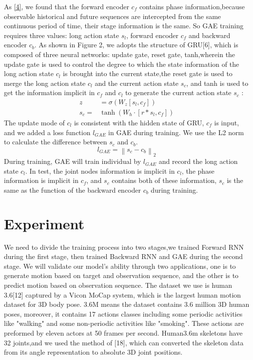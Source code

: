 \documentclass[conference]{IEEEtran}
\begin{document}
As \eqref{4}, we found that the forward encoder $c_f$ contains phase information,because observable historical and future sequences are intercepted from the same continuous period of time, their stage information is the same.
So GAE training requires three values: long action state $s_l$, forward encoder $c_f$ and backward encoder $c_b$.
As shown in Figure 2, we adopts the structure of GRU[6], which is composed of three neural networks: update gate, reset gate,
tanh,wherein the update gate is used to control the degree to which the state information of the long action state $c_l$ is brought into the current state,the reset gate is used to merge the long action state $c_l$ and the current action state $s_c$, and tanh is used to get the information implicit in $c_f$ and $c_l$ to generate the current action state $s_c$ :
\begin{equation}
\begin{aligned}
z &= \sigma(W_z[s_l,c_f]) \\
s_c = &\tanh(W_h \cdot [r * s_l , c_f])
\end{aligned}
\end{equation}
The update mode of $c_l$ is consistent with the hidden state of GRU, 
$c_f$ is input, and we added a loss function $l_{GAE}$ in GAE during training. We use the L2 norm to calculate the difference between $s_c$ and $c_b$.
\begin{equation}
l_{GAE} = \left \| s_c - c_b \right \|_2
\end{equation}
During training, GAE will train individual by $l_{GAE}$ and record the long action state $c_l$. In test, the joint nodes information is implicit in $c_l$, the phase information is implicit in $c_f$, and $s_c$ contains both of these information, $s_c$ is the same as the function of the backward encoder $c_b$ during training.

\section{Experiment}
We need to divide the training process into two stages,we trained Forward RNN during the first stage, then trained Backward RNN and GAE during the second stage. We will validate our model's ability through two applications, one is to generate motion based on target and observation sequence, and the other is to predict motion based on observation sequence. The dataset we use is human 3.6[12] captured by a Vicon MoCap system, which is the largest human motion dataset for 3D body pose. 3.6M means the dataset contains 3.6 million 3D human poses, moreover, it contains 17 actions classes including some periodic activities like "walking" and some non-periodic activities like "smoking". These actions are preformed by eleven actors at 50 frames per second. Human3.6m skeletons have 32 joints,and we used the method of [18], which can converted the skeleton data from its angle representation to absolute 3D joint positions.
\end{document}
